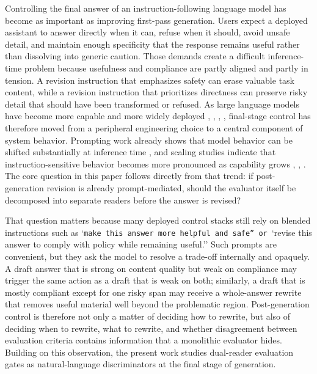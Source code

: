 \documentclass{article}
\begin{document}
Controlling the final answer of an instruction-following language model has become as important as improving first-pass generation. Users expect a deployed assistant to answer directly when it can, refuse when it should, avoid unsafe detail, and maintain enough specificity that the response remains useful rather than dissolving into generic caution. Those demands create a difficult inference-time problem because usefulness and compliance are partly aligned and partly in tension. A revision instruction that emphasizes safety can erase valuable task content, while a revision instruction that prioritizes directness can preserve risky detail that should have been transformed or refused. As large language models have become more capable and more widely deployed \cite{zhao2023survey}, \cite{openai2023technical}, \cite{bubeck2023sparks}, \cite{dwivedi2023opinion}, final-stage control has therefore moved from a peripheral engineering choice to a central component of system behavior. Prompting work already shows that model behavior can be shifted substantially at inference time \cite{liu2022pretrain}, and scaling studies indicate that instruction-sensitive behavior becomes more pronounced as capability grows \cite{chung2022scaling}, \cite{hewitt2024instruction}, \cite{elder2025boosting}. The core question in this paper follows directly from that trend: if post-generation revision is already prompt-mediated, should the evaluator itself be decomposed into separate readers before the answer is revised?

That question matters because many deployed control stacks still rely on blended instructions such as `\texttt{make this answer more helpful and safe'' or }`revise this answer to comply with policy while remaining useful.'' Such prompts are convenient, but they ask the model to resolve a trade-off internally and opaquely. A draft answer that is strong on content quality but weak on compliance may trigger the same action as a draft that is weak on both; similarly, a draft that is mostly compliant except for one risky span may receive a whole-answer rewrite that removes useful material well beyond the problematic region. Post-generation control is therefore not only a matter of deciding how to rewrite, but also of deciding when to rewrite, what to rewrite, and whether disagreement between evaluation criteria contains information that a monolithic evaluator hides. Building on this observation, the present work studies dual-reader evaluation gates as natural-language discriminators at the final stage of generation.
\end{document}
